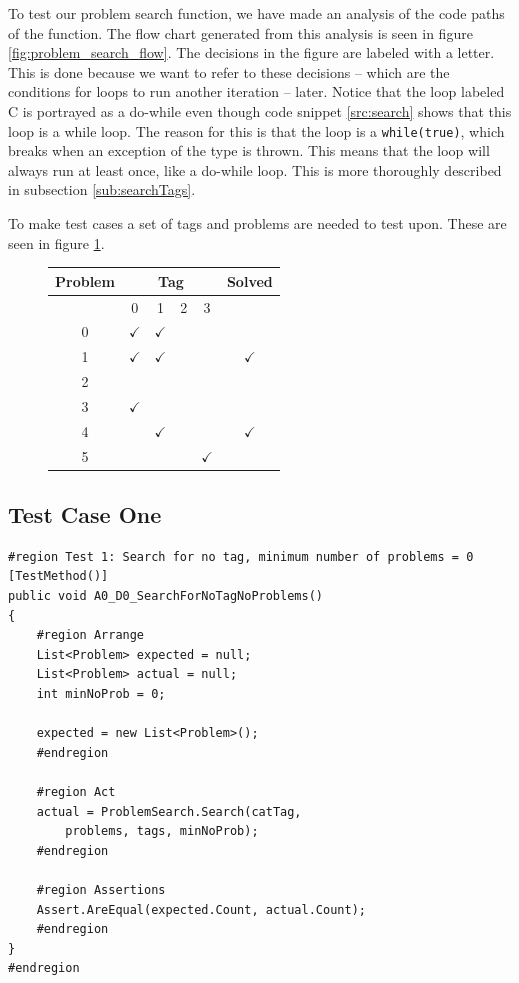 To test our problem search function, we have made an analysis of the code paths of the function.
The flow chart generated from this analysis is seen in figure \ref{fig:problem_search_flow}.
The decisions in the figure are labeled with a letter.
This is done because we want to refer to these decisions -- which are the conditions for loops to run another iteration -- later.
Notice that the loop labeled C is portrayed as a do-while even though code snippet \ref{src:search} shows that this loop is a while loop.
The reason for this is that the loop is a \verb|while(true)|, which breaks when an exception of the type  is thrown.
This means that the loop will always run at least once, like a do-while loop.
This is more thoroughly described in subsection \ref{sub:searchTags}.

To make test cases a set of tags and problems are needed to test upon.
These are seen in figure \ref{tab:problem_search_base}.

\begin{figure}[H]
	\centering
		\begin{tabular}{|c|c|c|c|c|c|}
		\hline
			Problem	& \multicolumn{4}{c|}{Tag} & Solved \\ \hline
								& 0&1&2&3& \\ \hline
			0					& $\checkmark$ & $\checkmark$ & & & \\ \hline
			1					& $\checkmark$ & $\checkmark$ & & & $\checkmark$  \\ \hline
			2					& & & & & \\ \hline
			3					& $\checkmark$& & & & \\ \hline
			4					& & $\checkmark$& & & $\checkmark$ \\ \hline
			5					& & & & $\checkmark$ & \\ \hline
		\end{tabular}
	\label{tab:problem_search_base}
\end{figure}


\subsection{Test Case One}
\begin{lstlisting}[style=sourceCode, caption=\myCaption{The test case for no run of any loops}, label=src:noLoops]
#region Test 1: Search for no tag, minimum number of problems = 0
[TestMethod()]
public void A0_D0_SearchForNoTagNoProblems()
{
	#region Arrange
	List<Problem> expected = null;
	List<Problem> actual = null;
	int minNoProb = 0;

	expected = new List<Problem>();
	#endregion

	#region Act
	actual = ProblemSearch.Search(catTag,
		problems, tags, minNoProb);
	#endregion

	#region Assertions
	Assert.AreEqual(expected.Count, actual.Count);
	#endregion
}
#endregion
\end{lstlisting}

